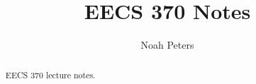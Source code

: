 \documentclass[a4paper]{report}
\author{Noah Peters}
\title{EECS 370 Notes}
\begin{document}
\maketitle

\begin{abstract}
	EECS 370 lecture notes.
\end{abstract}

\newpage

\tableofcontents


\newpage
\appendix
\appendixpage



\newpage
\printbibliography
\end{document}
